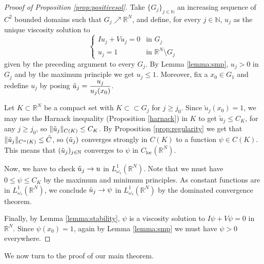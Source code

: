 \documentclass[a4paper,11pt]{article}
\newcommand{\R}{\mathbb{R}}
\newcommand{\N}{\mathbb{N}}
\newcommand{\I}{I}
\newcommand{\Lomega}{L_{\omega_s}^1(\R^N)}
\begin{document}
\begin{proof}[Prooof of Proposition \ref{prop:positivesol}]
Take $\{G_j\}_{j\in \N}$ an increasing sequence of $C^2$ bounded domains such that $G_j \nearrow \R^N$, and define, for every $j\in \N$, $u_j$ as the unique viscosity solution to 
\[\begin{cases}
\I u_j + Vu_j = 0 & \text{in } G_j \\
u_j = 1 & \text{in } \R^N \setminus G_j
\end{cases}\]
given by the preceding argument to every $G_j$. 
By Lemma \ref{lemma:smp}, $u_j>0$ in $G_j$ and by the maximum principle we get $u_j\leq 1$. Moreover, fix a $x_0 \in G_1$ and redefine $u_j$ by posing $\Tilde{u}_j = \dfrac{u_j}{u_j(x_0)} $.

Let $K\subset \R^N$ be a compact set with $K\subset \subset G_{j}$ for $j \geq j_0$. 
Since $\tilde u_j (x_0) =1$, we may use the Harnack inequality (Proposition \ref{harnack}) in $K$ to get $\tilde u_j \le C_K$, for any $j \ge j_0$, so $\|\Tilde{u}_j\|_{C(K)}\leq C_K$. By Proposition \ref{prop:regularity} we get that $\|\Tilde{u}_j\|_{C^{\alpha}(K)} \leq \Tilde{C}$, so $(\Tilde{u}_j)$ converges strongly in $C(K)$ to a function $\psi\in C(K)$. This means that $(\Tilde{u}_j)_{j\in\N}$ converges to $\psi$ in $C_{\text{loc}}(\R^N)$.

Now, we have to check $\Tilde{u}_j \rightarrow u$ in $L^1_{\omega_s}(\R^N)$. Note that we must have $ 0 \leq \psi \leq C_K$ by the maximum and minimum principles. As constant functions are in $\Lomega$, we conclude $\Tilde{u}_j \rightarrow \psi$ in $\Lomega$ by the dominated convergence theorem.

Finally, by Lemma \ref{lemma:stability}, $\psi$ is a viscosity solution to $\I\psi + V\psi = 0$ in $\R^N$. Since $\psi(x_0) =1$, again by  Lemma \ref{lemma:smp} we must have $\psi >0$ everywhere.
\end{proof}

We now turn to the proof of our main theorem.
\end{document}
